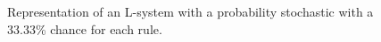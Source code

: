 \begin{flushleft}

\begin{figure}[htbp]
	{\centering
		\vspace{7px}
		\setlength{\fboxrule}{1pt}
		\caption{Representation of an L-system with a probability stochastic with a 33.33\% chance for each rule.}
	}
\end{figure}

\FloatBarrier


\end{flushleft}






